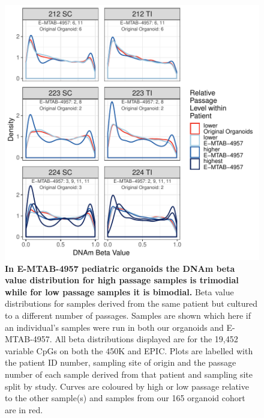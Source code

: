 \documentclass[a4paper]{article}
\begin{document}
\begin{figure}
\includegraphics[width=1\textwidth]{../figs/MTAB4957_EPIC_beta_paired.pdf}
\caption{\textbf{In E-MTAB-4957 pediatric organoids the DNAm beta value distribution for high passage samples is trimodial while for low passage samples it is bimodial.} Beta value distributions for samples derived from the same patient but cultured to a different number of passages. Samples are shown which here if an individual's samples were run in both our organoids and E-MTAB-4957. All beta distributions displayed are for the 19,452 variable CpGs on both the 450K and EPIC. Plots are labelled with the patient ID number, sampling site of origin and the passage number of each sample derived from that patient and sampling site split by study. Curves are coloured by high or low passage relative to the other sample(s) and samples from our 165 organoid cohort are in red.}
\end{figure}
\end{document}
